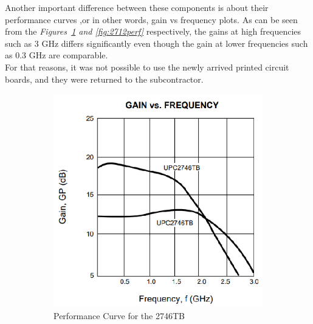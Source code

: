 	Another important difference between these components is about their performance curves ,or in other words, gain vs frequency plots. As can be seen from the \textit{Figures~\ref{fig:2746perf} and \ref{fig:2712perf}} respectively, the gains at high frequencies such as 3 GHz differs significantly even though the gain at lower frequencies such as 0.3 GHz are comparable. \\
	
	For that reasons, it was not possible to use the newly arrived printed circuit boards, and they were returned to the subcontractor.


\begin{figure}[H]
	\setlength{\unitlength}{\textwidth} 
	\centering
	\begin{subfigure}{.5\textwidth}
  		\centering
  		\includegraphics[width=0.45\unitlength]{2746_perf}
  		\caption{\label{fig:2746perf}Performance Curve for the 2746TB }
	\end{subfigure}%
	\begin{subfigure}{.5\textwidth}
  		\centering

\end{subfigure}
\end{figure}
